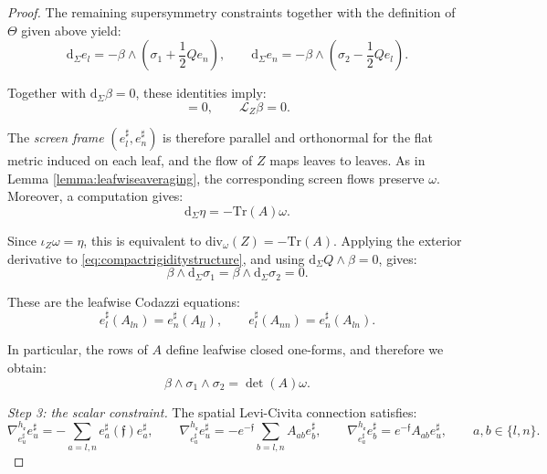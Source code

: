 \documentclass[10pt,reqno,a4paper]{amsart}
\theoremstyle{plain}
\theoremstyle{definition}
\theoremstyle{remark}
\theoremstyle{remark}
\def\dd{\mathrm{d}}
\newcommand{\Tr}{\mathrm{Tr}}
\def\cL{\mathcal{L}}
\def\cL{\mathcal{L}}
\def\fre{\mathfrak{e}}
\renewcommand{\(}{ (}
\renewcommand{\)}{ )}
\newcommand{\frf}{\mathfrak{f}}
\begin{document}
\begin{proof}
\noindent
The remaining supersymmetry constraints together with the definition of $\Theta$ given above yield:
\begin{equation}
\label{eq:compactrigiditystructure}
\dd_{\Sigma}e_l = -\beta\wedge (\sigma_1+\frac{1}{2}Qe_n ), \qquad
\dd_{\Sigma}e_n = -\beta\wedge (\sigma_2-\frac{1}{2}Qe_l ).
\end{equation}
	
\noindent
Together with $\dd_{\Sigma}\beta=0$, these identities imply:
\begin{equation*}
[e_l^{\sharp},e_n^{\sharp}]=0, \qquad\cL_Z\beta=0.
\end{equation*}
	
\noindent
The \emph{screen frame} $(e^{\sharp}_l, e^{\sharp}_n)$ is therefore parallel and orthonormal for the flat metric induced on each leaf, and the flow of $Z$ maps leaves to leaves. As in Lemma \ref{lemma:leafwiseaveraging}, the corresponding screen flows preserve $\omega$. Moreover, a computation gives:
\begin{equation}
\label{eq:compactrigiditydivergence}
\dd_{\Sigma}\eta=-\Tr(A)\omega.
\end{equation}
	
\noindent
Since $\iota_Z\omega=\eta$, this is equivalent to $\mathrm{div}_{\omega}(Z)=-\Tr(A)$. Applying the exterior derivative to \eqref{eq:compactrigiditystructure}, and using $\dd_{\Sigma}Q\wedge\beta=0$, gives:
\begin{equation}
\label{eq:compactrigiditycodazzi}
\beta\wedge\dd_{\Sigma}\sigma_1 = \beta\wedge\dd_{\Sigma}\sigma_2=0.
\end{equation}
	
\noindent
These are the leafwise Codazzi equations:
\begin{equation*}
e_l^{\sharp}(A_{ln})=e_n^{\sharp}(A_{ll}), \qquad e_l^{\sharp}(A_{nn})=e_n^{\sharp}(A_{ln}).
\end{equation*}
	
\noindent
In particular, the rows of $A$ define leafwise closed one-forms, and therefore we obtain:
\begin{equation*}
\beta\wedge\sigma_1\wedge\sigma_2=\det(A)\omega.
\end{equation*}
	
\medskip
\noindent
\emph{Step 3: the scalar constraint.} The spatial Levi-Civita connection satisfies:
\begin{equation*}
\nabla^{h_{\fre}}_{e_u^{\sharp}}e_u^{\sharp} = -\sum_{a=l,n}e_a^{\sharp}(\frf)e_a^{\sharp}, \qquad \nabla^{h_{\fre}}_{e_a^{\sharp}}e_u^{\sharp} = -e^{-\frf}\sum_{b=l,n}A_{ab}e_b^{\sharp}, \qquad \nabla^{h_{\fre}}_{e_a^{\sharp}}e_b^{\sharp} = e^{-\frf}A_{ab}e_u^{\sharp},
		\qquad a,b\in\{l,n\}.
\end{equation*}
	

\end{proof}
\end{document}
